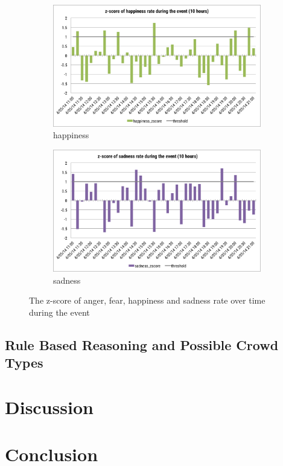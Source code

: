\begin{figure}[htb!]
\begin{subfigure}{0.5\textwidth}
\centering    
\includegraphics[width=0.98\linewidth]{HappinessZscoreEvent}
\caption{happiness}
\label{fig:happinessZscoreEvent}
\end{subfigure}%
\begin{subfigure}{0.5\textwidth}
\centering    
\includegraphics[width=0.98\linewidth]{SadnessZscoreEvent}
\caption{sadness}
\label{fig:sadnessZscoreEvent}
\end{subfigure}
\caption{The z-score of anger, fear, happiness and sadness rate over time during the event}
\end{figure}

\subsection{Rule Based Reasoning and Possible Crowd Types}

\section{Discussion}

\section{Conclusion}